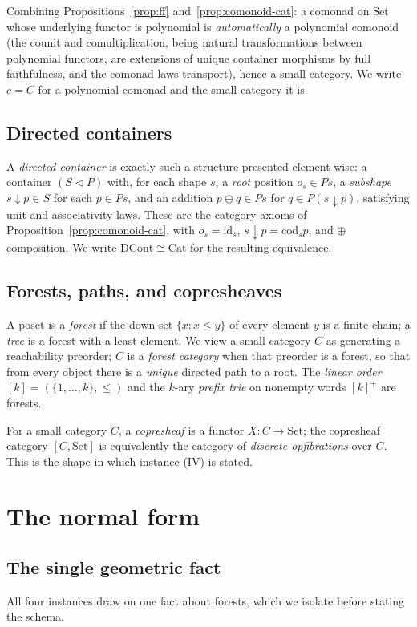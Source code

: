 \documentclass[11pt,reqno]{amsart}
\theoremstyle{plain}
\theoremstyle{definition}
\newcommand{\Set}{\mathrm{Set}}
\newcommand{\Cat}{\mathrm{Cat}}
\newcommand{\DCont}{\mathrm{DCont}}
\newcommand{\cod}{\mathrm{cod}}
\newcommand{\id}{\mathrm{id}}
\begin{document}
Combining Propositions~\ref{prop:ff} and~\ref{prop:comonoid-cat}: a comonad on $\Set$ whose underlying
functor is polynomial is \emph{automatically} a polynomial comonoid (the counit and comultiplication,
being natural transformations between polynomial functors, are extensions of unique container morphisms
by full faithfulness, and the comonad laws transport), hence a small category. We write $c = C$ for a
polynomial comonad and the small category it is.

\subsection{Directed containers}
A \emph{directed container} \cite{AhmanChapmanUustalu2014,AhmanUustalu2016} is exactly such a structure
presented element-wise: a container $(S \triangleleft P)$ with, for each shape $s$, a \emph{root}
position $o_s \in P s$, a \emph{subshape} $s \downarrow p \in S$ for each $p \in P s$, and an addition
$p \oplus q \in P s$ for $q \in P(s \downarrow p)$, satisfying unit and associativity laws. These are the
category axioms of Proposition~\ref{prop:comonoid-cat}, with $o_s = \id_s$, $s \downarrow p = \cod_s p$,
and $\oplus$ composition. We write $\DCont \cong \Cat$ for the resulting equivalence.

\subsection{Forests, paths, and copresheaves}
A poset is a \emph{forest} if the down-set $\{x : x \le y\}$ of every element $y$ is a finite chain;
a \emph{tree} is a forest with a least element. We view a small category $C$ as generating a reachability
preorder; $C$ is a \emph{forest category} when that preorder is a forest, so that from every object there
is a \emph{unique} directed path to a root. The \emph{linear order} $[k] = (\{1,\dots,k\},\le)$ and the
$k$-ary \emph{prefix trie} on nonempty words $[k]^{+}$ are forests.

For a small category $C$, a \emph{copresheaf} is a functor $X : C \to \Set$; the copresheaf category
$[C,\Set]$ is equivalently the category of \emph{discrete opfibrations} over $C$. This is the shape in
which instance (IV) is stated.

\section{The normal form}\label{sec:schema}

\subsection{The single geometric fact}
All four instances draw on one fact about forests, which we isolate before stating the schema.
\end{document}
